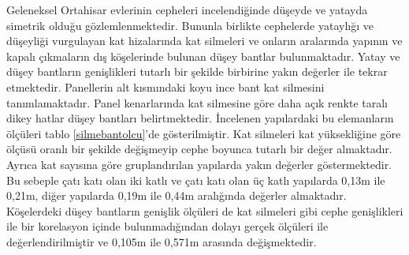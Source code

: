 \documentclass[12pt,turkish,a4paperpaper,]{report}
\begin{document}
\newpage

Geleneksel Ortahisar evlerinin cepheleri incelendiğinde düşeyde ve
yatayda simetrik olduğu gözlemlenmektedir. Bununla birlikte cephelerde
yataylığı ve düşeyliği vurgulayan kat hizalarında kat silmeleri ve
onların aralarında yapının ve kapalı çıkmaların dış köşelerinde bulunan
düşey bantlar bulunmaktadır. Yatay ve düşey bantların genişlikleri
tutarlı bir şekilde birbirine yakın değerler ile tekrar etmektedir.
Panellerin alt kısmındaki koyu ince bant kat silmesini tanımlamaktadır.
Panel kenarlarında kat silmesine göre daha açık renkte taralı dikey
hatlar düşey bantları belirtmektedir. İncelenen yapılardaki bu
elemanların ölçüleri tablo \ref{silmebantolcu}'de gösterilmiştir. Kat
silmeleri kat yüksekliğine göre ölçüsü oranlı bir şekilde değişmeyip
cephe boyunca tutarlı bir değer almaktadır. Ayrıca kat sayısına göre
gruplandırılan yapılarda yakın değerler göstermektedir. Bu sebeple çatı
katı olan iki katlı ve çatı katı olan üç katlı yapılarda 0,13m ile
0,21m, diğer yapılarda 0,19m ile 0,44m aralığında değerler almaktadır.
Köşelerdeki düşey bantların genişlik ölçüleri de kat silmeleri gibi
cephe genişlikleri ile bir korelasyon içinde bulunmadığından dolayı
gerçek ölçüleri ile değerlendirilmiştir ve 0,105m ile 0,571m arasında
değişmektedir.
\end{document}
